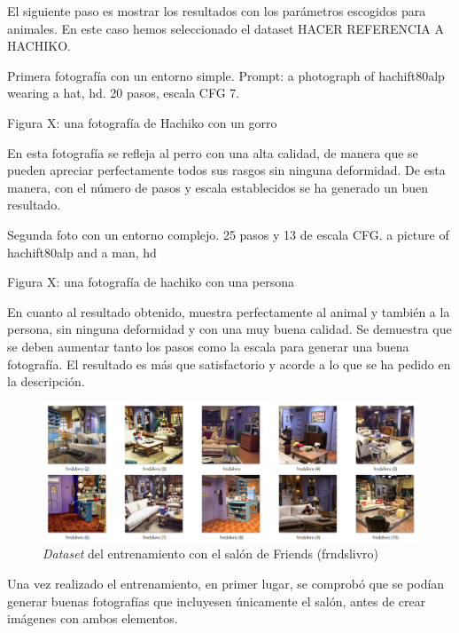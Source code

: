 El siguiente paso es mostrar los resultados con los parámetros escogidos para animales. En este caso hemos seleccionado el dataset HACER REFERENCIA A HACHIKO.

Primera fotografía con un entorno simple. Prompt: a photograph of hachift80alp wearing a hat, hd. 20 pasos, escala CFG 7.



Figura X: una fotografía de Hachiko con un gorro

En esta fotografía se refleja al perro con una alta calidad, de manera que se pueden apreciar perfectamente todos sus rasgos sin ninguna deformidad. De esta manera, con el número de pasos y escala establecidos se ha generado un buen resultado.

Segunda foto con un entorno complejo. 25 pasos y 13 de escala CFG.
a picture of hachift80alp and a man, hd

Figura X: una fotografía de hachiko con una persona

En cuanto al resultado obtenido, muestra perfectamente al animal y también a la persona, sin ninguna deformidad y con una muy buena calidad. Se demuestra que se deben aumentar tanto los pasos como la escala para generar una buena fotografía. El resultado es más que satisfactorio y acorde a lo que se ha pedido en la descripción.


\begin{figure}[!htb]
	\centering
	\includegraphics[width = 1
	\textwidth]{Imagenes/Vectorial/dataset_frdslivro.png}
	\caption{\textit{Dataset} del entrenamiento con el salón de Friends (frndslivro)}
	\label{fig:dataset_frdslivro}
\end{figure}


Una vez realizado el entrenamiento, en primer lugar, se comprobó que se podían generar buenas fotografías que incluyesen únicamente el salón, antes de crear imágenes con ambos elementos.\\

